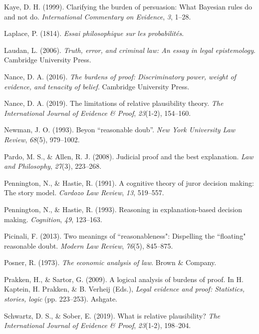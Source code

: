\documentclass[10pt,dvipsnames]{scrartcl}
\begin{document}
\hypertarget{ref-Kaye1999clarifying}{}
Kaye, D. H. (1999). Clarifying the burden of persuasion: What Bayesian
rules do and not do. \emph{International Commentary on Evidence},
\emph{3}, 1--28.

\hypertarget{ref-Laplace1814}{}
Laplace, P. (1814). \emph{Essai philosophique sur les probabilités}.

\hypertarget{ref-laudan2006truth}{}
Laudan, L. (2006). \emph{Truth, error, and criminal law: An essay in
legal epistemology}. Cambridge University Press.

\hypertarget{ref-nance2016}{}
Nance, D. A. (2016). \emph{The burdens of proof: Discriminatory power,
weight of evidence, and tenacity of belief}. Cambridge University Press.

\hypertarget{ref-nance2019LimitationsRelativePlausibility}{}
Nance, D. A. (2019). The limitations of relative plausibility theory.
\emph{The International Journal of Evidence \& Proof}, \emph{23}(1-2),
154--160.

\hypertarget{ref-newman1993}{}
Newman, J. O. (1993). Beyon ``reasonable doub''. \emph{New York
University Law Review}, \emph{68}(5), 979--1002.

\hypertarget{ref-Pardo2008judicial}{}
Pardo, M. S., \& Allen, R. J. (2008). Judicial proof and the best
explanation. \emph{Law and Philosophy}, \emph{27}(3), 223--268.

\hypertarget{ref-Pennington1991}{}
Pennington, N., \& Hastie, R. (1991). A cognitive theory of juror
decision making: The story model. \emph{Cardozo Law Review}, \emph{13},
519--557.

\hypertarget{ref-penn1993}{}
Pennington, N., \& Hastie, R. (1993). Reasoning in explanation-based
decision making. \emph{Cognition}, \emph{49}, 123--163.

\hypertarget{ref-picinali2013}{}
Picinali, F. (2013). Two meanings of ``reasonableness": Dispelling the
``floating" reasonable doubt. \emph{Modern Law Review}, \emph{76}(5),
845--875.

\hypertarget{ref-Posner1973}{}
Posner, R. (1973). \emph{The economic analysis of law}. Brown \&
Company.

\hypertarget{ref-prakken2009}{}
Prakken, H., \& Sartor, G. (2009). A logical analysis of burdens of
proof. In H. Kaptein, H. Prakken, \& B. Verheij (Eds.), \emph{Legal
evidence and proof: Statistics, stories, logic} (pp. 223--253). Ashgate.

\hypertarget{ref-schwartz2019WhatRelativePlausibility}{}
Schwartz, D. S., \& Sober, E. (2019). What is relative plausibility?
\emph{The International Journal of Evidence \& Proof}, \emph{23}(1-2),
198--204.
\end{document}
